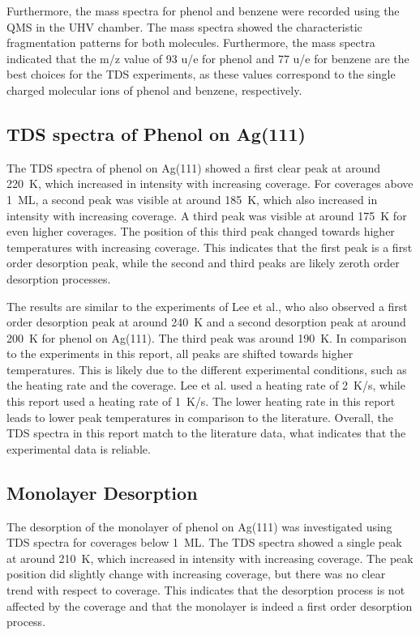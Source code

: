 \documentclass[fontsize=11pt,reqno,a4paper,oneside]{scrartcl}
\begin{document}
Furthermore, the mass spectra for phenol and benzene were recorded using the \ac{QMS} in the \ac{UHV} chamber. The mass spectra showed the characteristic fragmentation patterns for both molecules. Furthermore, the mass spectra indicated that the m/z value of 93 u/e for phenol and 77 u/e for benzene are the best choices for the \ac{TDS} experiments, as these values correspond to the single charged molecular ions of phenol and benzene, respectively.

\subsection{TDS spectra of Phenol on Ag(111)}

The \ac{TDS} spectra of phenol on Ag(111) showed a first clear peak at around 220~K, which increased in intensity with increasing coverage. For coverages above 1~ML, a second peak was visible at around 185~K, which also increased in intensity with increasing coverage. A third peak was visible at around 175~K for even higher coverages. The position of this third peak changed towards higher temperatures with increasing coverage. This indicates that the first peak is a first order desorption peak, while the second and third peaks are likely zeroth order desorption processes.

The results are similar to the experiments of Lee et al.\autocite{Lee2001}, who also observed a first order desorption peak at around 240~K and a second desorption peak at around 200~K for phenol on Ag(111). The third peak was around 190~K. In comparison to the experiments in this report, all peaks are shifted towards higher temperatures. This is likely due to the different experimental conditions, such as the heating rate and the coverage. Lee et al.\autocite{Lee2001} used a heating rate of 2~K/s, while this report used a heating rate of 1~K/s. The lower heating rate in this report leads to lower peak temperatures in comparison to the literature. Overall, the \ac{TDS} spectra in this report match to the literature data\autocite{Lee2001}, what indicates that the experimental data is reliable.


\subsection{Monolayer Desorption}

The desorption of the monolayer of phenol on Ag(111) was investigated using \ac{TDS} spectra for coverages below 1~ML. The \ac{TDS} spectra showed a single peak at around 210~K, which increased in intensity with increasing coverage. The peak position did slightly change with increasing coverage, but there was no clear trend with respect to coverage. This indicates that the desorption process is not affected by the coverage and that the monolayer is indeed a first order desorption process.
\end{document}
